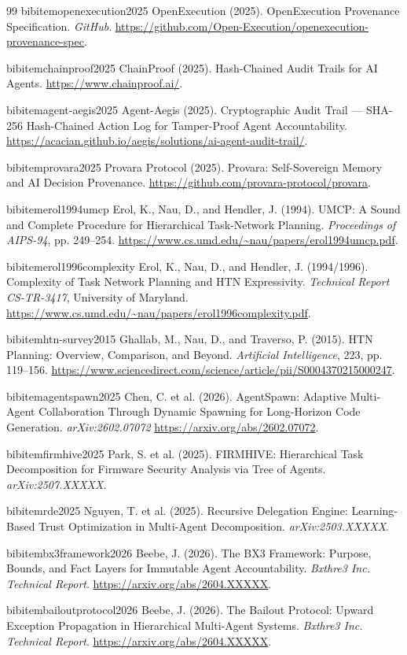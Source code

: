 \begin{thebibliography}{99}
bibitem{openexecution2025}
OpenExecution (2025). OpenExecution Provenance Specification. \textit{GitHub}. \url{https://github.com/Open-Execution/openexecution-provenance-spec}.

bibitem{chainproof2025}
ChainProof (2025). Hash-Chained Audit Trails for AI Agents. \url{https://www.chainproof.ai/}.

bibitem{agent-aegis2025}
Agent-Aegis (2025). Cryptographic Audit Trail --- SHA-256 Hash-Chained Action Log for Tamper-Proof Agent Accountability. \url{https://acacian.github.io/aegis/solutions/ai-agent-audit-trail/}.

bibitem{provara2025}
Provara Protocol (2025). Provara: Self-Sovereign Memory and AI Decision Provenance. \url{https://github.com/provara-protocol/provara}.


bibitem{erol1994umcp}
Erol, K., Nau, D., and Hendler, J. (1994). UMCP: A Sound and Complete Procedure for Hierarchical Task-Network Planning. \textit{Proceedings of AIPS-94}, pp. 249--254. \url{https://www.cs.umd.edu/~nau/papers/erol1994umcp.pdf}.

bibitem{erol1996complexity}
Erol, K., Nau, D., and Hendler, J. (1994/1996). Complexity of Task Network Planning and HTN Expressivity. \textit{Technical Report CS-TR-3417}, University of Maryland. \url{https://www.cs.umd.edu/~nau/papers/erol1996complexity.pdf}.

bibitem{htn-survey2015}
Ghallab, M., Nau, D., and Traverso, P. (2015). HTN Planning: Overview, Comparison, and Beyond. \textit{Artificial Intelligence}, 223, pp. 119--156. \url{https://www.sciencedirect.com/science/article/pii/S0004370215000247}.

bibitem{agentspawn2025}
Chen, C. et al. (2026). AgentSpawn: Adaptive Multi-Agent Collaboration Through Dynamic Spawning for Long-Horizon Code Generation. \textit{arXiv:2602.07072} \url{https://arxiv.org/abs/2602.07072}.

bibitem{firmhive2025}
Park, S. et al. (2025). FIRMHIVE: Hierarchical Task Decomposition for Firmware Security Analysis via Tree of Agents. \textit{arXiv:2507.XXXXX}.

bibitem{rde2025}
Nguyen, T. et al. (2025). Recursive Delegation Engine: Learning-Based Trust Optimization in Multi-Agent Decomposition. \textit{arXiv:2503.XXXXX}.

bibitem{bx3framework2026}
Beebe, J. (2026). The BX3 Framework: Purpose, Bounds, and Fact Layers for Immutable Agent Accountability. \textit{Bxthre3 Inc. Technical Report}. \url{https://arxiv.org/abs/2604.XXXXX}.

bibitem{bailoutprotocol2026}
Beebe, J. (2026). The Bailout Protocol: Upward Exception Propagation in Hierarchical Multi-Agent Systems. \textit{Bxthre3 Inc. Technical Report}. \url{https://arxiv.org/abs/2604.XXXXX}.

\end{thebibliography}